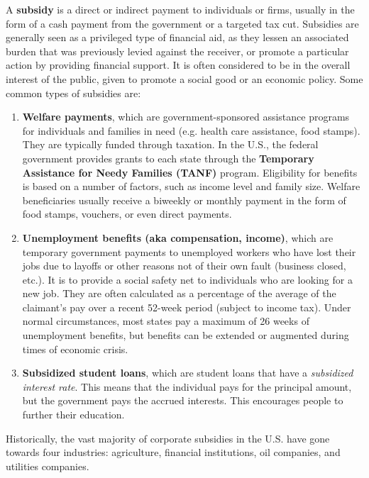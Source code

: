 \documentclass{article}
\begin{document}
  \begin{definition}[Subsidies]
    \label{def:subsidies}
    A \textbf{subsidy} is a direct or indirect payment to individuals or firms, usually in the form of a cash payment from the government or a targeted tax cut. Subsidies are generally seen as a privileged type of financial aid, as they lessen an associated burden that was previously levied against the receiver, or promote a particular action by providing financial support. It is often considered to be in the overall interest of the public, given to promote a social good or an economic policy. Some common types of subsidies are: 
    \begin{enumerate}
      \item \textbf{Welfare payments}, which are government-sponsored assistance programs for individuals and families in need (e.g. health care assistance, food stamps). They are typically funded through taxation. In the U.S., the federal government provides grants to each state through the \textbf{Temporary Assistance for Needy Families (TANF)} program. Eligibility for benefits is based on a number of factors, such as income level and family size. Welfare beneficiaries usually receive a biweekly or monthly payment in the form of food stamps, vouchers, or even direct payments. 
      \item \textbf{Unemployment benefits (aka compensation, income)}, which are temporary government payments to unemployed workers who have lost their jobs due to layoffs or other reasons not of their own fault (business closed, etc.). It is to provide a social safety net to individuals who are looking for a new job. They are often calculated as a percentage of the average of the claimant's pay over a recent 52-week period (subject to income tax). Under normal circumstances, most states pay a maximum of 26 weeks of unemployment benefits, but benefits can be extended or augmented during times of economic crisis. 
      \item \textbf{Subsidized student loans}, which are student loans that have a \textit{subsidized interest rate}. This means that the individual pays for the principal amount, but the government pays the accrued interests. This encourages people to further their education. 
    \end{enumerate}
    Historically, the vast majority of corporate subsidies in the U.S. have gone towards four industries: agriculture, financial institutions, oil companies, and utilities companies. 
  \end{definition}
\end{document}
